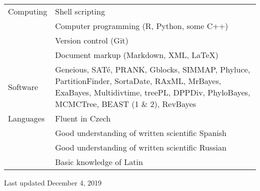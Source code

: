 \documentclass[10pt]{article}
\begin{document}
\begin{tabularx}{\textwidth}{>{\raggedleft\arraybackslash}p{2.2cm} X}
Computing & Shell scripting \\
& Computer programming (\textsf{R}, \textsf{Python}, some \textsf{C++}) \\
& Version control (\textsf{Git}) \\
& Document markup (Markdown, XML, \LaTeX) \\[0.1cm]
Software & \textsf{Geneious}, \textsf{SAT\'{e}}, \textsf{PRANK}, \textsf{Gblocks}, \textsf{SIMMAP}, \textsf{Phyluce}, \textsf{PartitionFinder}, \textsf{SortaDate}, \textsf{RAxML}, \textsf{MrBayes}, \textsf{ExaBayes}, \textsf{Multidivtime}, \textsf{treePL}, \textsf{DPPDiv}, \textsf{PhyloBayes}, \textsf{MCMCTree}, \textsf{BEAST (1 \& 2)}, \textsf{RevBayes} \\[0.1cm]
Languages & Fluent in Czech \\
& Good understanding of written scientific Spanish \\
& Good understanding of written scientific Russian \\
& Basic knowledge of Latin
\end{tabularx}

\vspace*{1cm}

\begin{center}
Last updated December 4, 2019
\end{center}
\end{document}
